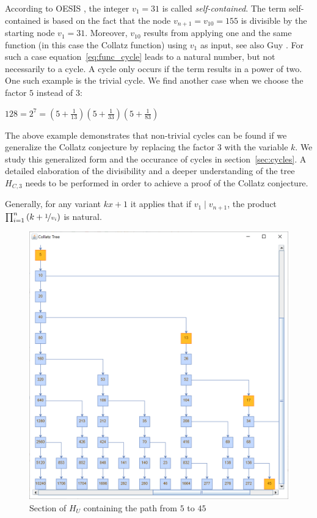 According to OESIS \cite{Ref_OESIS}, the integer $v_1=31$ is called \textit{self-contained}. The term self-contained is based on the fact that the node $v_{n+1}=v_{10}=155$ is divisible by the starting node $v_1=31$. Moreover, $v_{10}$ results from applying one and the same function (in this case the Collatz function) using $v_1$ as input, see also Guy \cite[p.~332]{Ref_Guy}. For such a case equation~\ref{eq:func_cycle} leads to a natural number, but not necessarily to a cycle. A cycle only occurs if the term results in a power of two. One such example is the trivial cycle. We find another case when we choose the factor $5$ instead of $3$:
\begin{center}
	$128=2^7=\left(5+\frac{1}{13}\right)\left(5+\frac{1}{33}\right)
	\left(5+\frac{1}{83}\right)$
\end{center}

The above example demonstrates that non-trivial cycles can be found if we generalize the Collatz conjecture by replacing the factor $3$ with the variable $k$. We study this generalized form and the occurance of cycles in section~\ref{sec:cycles}. A detailed elaboration of the divisibility and a deeper understanding of the tree $H_{C,3}$ needs to be performed in order to achieve a proof of the Collatz conjecture.

Generally, for any variant $kx+1$ it applies that if $v_1\mid v_{n+1}$, the product $\prod_{i=1}^n\left(k+\nicefrac{1}{v_i}\right)$ is natural.

\newpage

\begin{figure}[H]
	\includegraphics[width=1.00\textwidth]{figures/h_u.png}
	\caption{Section of $H_U$ containing the path from $5$ to $45$}
	\label{fig:3}
\end{figure}


